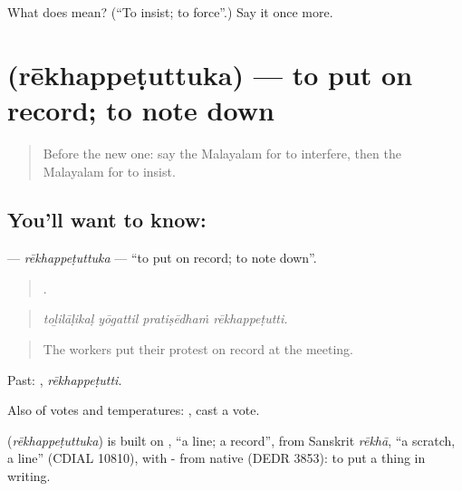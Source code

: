 \begin{tcolorbox}[breakable,colback=teal!4,colframe=teal!35!black,title={Before you move on}]
What does  mean? (\textquotedblleft{}To insist; to force\textquotedblright{}.) Say it once more.
\end{tcolorbox}
\section[\texorpdfstring{\ml{രേഖപ്പെടുത്തുക} (rēkhappeṭuttuka)}{രേഖപ്പെടുത്തുക (rēkhappeṭuttuka)}]{ (rēkhappeṭuttuka) — to put on record; to note down}

\label{lesson:ML-C451-rekhappetuttuka}



\begin{quote}
Before the new one: say the Malayalam for to interfere, then the Malayalam for to insist.
\end{quote}

\subsection*{You'll want to know: }
\textbf{} — \emph{rēkhappeṭuttuka} — \textquotedblleft{}to put on record; to note down\textquotedblright{}.

\begin{quote}
   .
\end{quote}

\begin{quote}
\emph{toḻilāḷikaḷ yōgattil pratiṣēdhaṁ rēkhappeṭutti.}
\end{quote}

\begin{quote}
The workers put their protest on record at the meeting.
\end{quote}

Past: , \emph{rēkhappeṭutti}.

Also of votes and temperatures:  , cast a vote.

\begin{cousinweb}
\textbf{} (\emph{rēkhappeṭuttuka}) is built on , \textquotedblleft{}a line; a record\textquotedblright{}, from Sanskrit \emph{rēkhā}, \textquotedblleft{}a scratch, a line\textquotedblright{} (CDIAL 10810), with - from native  (DEDR 3853): to put a thing in writing.
\end{cousinweb}

